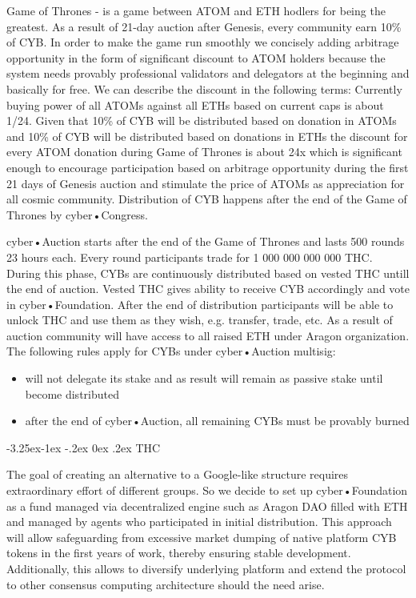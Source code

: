 \documentclass[8pt,oneside]{amsart}
\makeatletter
\renewcommand\subsection{\@startsection{subsection}{2}{\z@}%
                                     {-3.25ex\@plus -1ex \@minus -.2ex}%
                                     {0ex \@plus .2ex}%
                                     {\play\Large}}%
\newcommand{\titleSection}[1]{\subsection{#1}}
\makeatother
\begin{document}
\begin{Abstract}
Game of Thrones - is a game between ATOM and ETH hodlers for being the greatest. As a result of 21-day auction after Genesis, every community earn 10\% of CYB. In order to make the game run smoothly we concisely adding arbitrage opportunity in the form of significant discount to ATOM holders because the system needs provably professional validators and delegators at the beginning and basically for free. We can describe the discount in the following terms: Currently buying power of all ATOMs against all ETHs based on current caps is about 1/24. Given that 10\% of CYB will be distributed based on donation in ATOMs and 10\% of CYB will be distributed based on donations in ETHs the discount for every ATOM donation during Game of Thrones is about 24x which is significant enough to encourage participation based on arbitrage opportunity during the first 21 days of Genesis auction and stimulate the price of ATOMs as appreciation for all cosmic community. Distribution of CYB happens after the end of the Game of Thrones by cyber•Congress.

cyber•Auction starts after the end of the Game of Thrones and lasts 500 rounds 23 hours each. Every round participants trade for 1 000 000 000 000 THC. During this phase, CYBs are continuously distributed based on vested THC untill the end of auction. Vested THC gives ability to receive CYB accordingly and vote in cyber•Foundation. After the end of distribution participants will be able to unlock THC and use them as they wish, e.g. transfer, trade, etc. As a result of auction community will have access to all raised ETH under Aragon organization. The following rules apply for CYBs under cyber•Auction multisig:

\begin{itemize}
\item will not delegate its stake and as result will remain as passive stake until become distributed
\item after the end of cyber•Auction, all remaining CYBs must be provably burned
\end{itemize}

\titleSection{THC}\label{thc}

The goal of creating an alternative to a Google-like structure requires extraordinary effort of different groups. So we decide to set up cyber•Foundation as a fund managed via decentralized engine such as Aragon DAO filled with ETH and managed by agents who participated in initial distribution. This approach will allow safeguarding from excessive market dumping of native platform CYB tokens in the first years of work, thereby ensuring stable development. Additionally, this allows to diversify underlying platform and extend the protocol to other consensus computing architecture should the need arise.


\end{Abstract}
\end{document}
